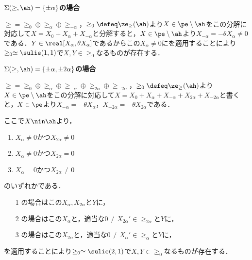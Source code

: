 \begin{npfwn}

  \begin{case}
    \textbf{$\Sigma(\ge,\ah) = \{\pm\alpha\} $の場合}

    $\ge = \ge_{0} \oplus \ge_{\alpha}\oplus \ge_{-\alpha} $，$\ge_0 \defeq \ze_{\ge}(\ah) $より$X\in  \pe\setminus \ah$をこの分解に対応して$X = X_0 + X_{\alpha} + X_{-\alpha} $と分解すると，$X\in \pe\setminus \ah$より$ X_{-\alpha} = -\theta X_{\alpha}\neq 0 $である．$Y\in \real [X_{\alpha}, \theta X_{\alpha}] $であるからこの$X_{\alpha}\neq 0 $にを適用することにより$\ge_0\simeq \sulie(1,1)$で$X,Y\in \ge_0 $なるものが存在する．
    
  \end{case}
  
  \begin{case}
    \textbf{$\Sigma(\ge,\ah) = \{\pm\alpha, \pm 2\alpha\} $の場合}

    $\ge = \ge_{0} \oplus \ge_{\alpha}\oplus \ge_{-\alpha} \oplus \ge_{2\alpha}\oplus \ge_{-2\alpha}  $，$\ge_0 \defeq \ze_{\ge}(\ah) $より$X\in \pe\setminus \ah$をこの分解に対応して$X = X_0 + X_{\alpha} + X_{-\alpha} + X_{2\alpha} + X_{-2\alpha} $と書くと，$X\in \pe$より$ X_{-\alpha} = - \theta X_{\alpha} $，$ X_{-2\alpha} = - \theta X_{2\alpha} $である．

    ここで$X\nin \ah$より，
    \begin{enumerate}
    \item $X_{\alpha}\neq 0 $かつ$X_{2\alpha}\neq 0 $
    \item $X_{\alpha}\neq 0 $かつ$X_{2\alpha} =  0 $
    \item $X_{\alpha} =  0 $かつ$X_{2\alpha} \neq  0 $
    \end{enumerate}
    のいずれかである．
    \begin{enumerate}
    \item[1] の場合はこの$X_{\alpha}, X_{2\alpha} $と$Y$に，
    \item[2] の場合はこの$X_{\alpha}$と，適当な$0\neq X_{2\alpha}'\in \ge_{2\alpha} $と$Y$に，
    \item[3] の場合はこの$X_{2\alpha}$と，適当な$0\neq X_{\alpha}'\in \ge_{\alpha} $と$Y$に，
    \end{enumerate}
    を適用することにより$\ge_0\simeq \sulie(2,1)$で$X,Y\in \ge_0 $なるものが存在する．
    
  \end{case}   
\end{npfwn}

